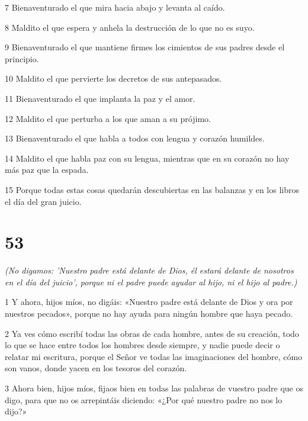 \par 7 Bienaventurado el que mira hacia abajo y levanta al caído.

\par 8 Maldito el que espera y anhela la destrucción de lo que no es suyo.

\par 9 Bienaventurado el que mantiene firmes los cimientos de sus padres desde el principio.

\par 10 Maldito el que pervierte los decretos de sus antepasados.

\par 11 Bienaventurado el que implanta la paz y el amor.

\par 12 Maldito el que perturba a los que aman a su prójimo.

\par 13 Bienaventurado el que habla a todos con lengua y corazón humildes.

\par 14 Maldito el que habla paz con su lengua, mientras que en su corazón no hay más paz que la espada.

\par 15 Porque todas estas cosas quedarán descubiertas en las balanzas y en los libros el día del gran juicio.

\chapter{53}

\par \textit{(No digamos: 'Nuestro padre está delante de Dios, él estará delante de nosotros en el día del juicio', porque ni el padre puede ayudar al hijo, ni el hijo al padre.)}

\par 1 Y ahora, hijos míos, no digáis: «Nuestro padre está delante de Dios y ora por nuestros pecados», porque no hay ayuda para ningún hombre que haya pecado.

\par 2 Ya ves cómo escribí todas las obras de cada hombre, antes de su creación, todo lo que se hace entre todos los hombres desde siempre, y nadie puede decir o relatar mi escritura, porque el Señor ve todas las imaginaciones del hombre, cómo son vanos, donde yacen en los tesoros del corazón.

\par 3 Ahora bien, hijos míos, fijaos bien en todas las palabras de vuestro padre que os digo, para que no os arrepintáis diciendo: «¿Por qué nuestro padre no nos lo dijo?»

